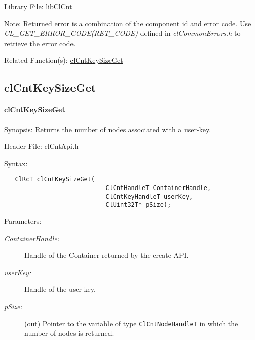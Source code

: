 \begin{Desc}
\item[Library File:]lib\-Cl\-Cnt\end{Desc}
\begin{Desc}
\item[Note:]Returned error is a combination of the component id and error code. Use \textit{CL\_\-GET\_\-ERROR\_\-CODE(RET\_\-CODE)} defined in \textit{clCommonErrors.h} to retrieve the error code.\end{Desc}
\begin{Desc}
\item[Related Function(s):]\hyperlink{pagecnt119}{cl\-Cnt\-Key\-Size\-Get} \end{Desc}


\newpage
\subsection{clCntKeySizeGet}
\hypertarget{pagecnt119}{}\paragraph{cl\-Cnt\-Key\-Size\-Get}\label{pagecnt119}
\begin{Desc}
\item[Synopsis:]Returns the number of nodes associated with a user-key.\end{Desc}
\begin{Desc}
\item[Header File:]clCntApi.h\end{Desc}
\begin{Desc}
\item[Syntax:]

\footnotesize\begin{verbatim}   ClRcT clCntKeySizeGet(
                  			ClCntHandleT ContainerHandle,
                  			ClCntKeyHandleT userKey,
                  			ClUint32T* pSize);
\end{verbatim}
\normalsize
\end{Desc}
\begin{Desc}
\item[Parameters:]
\begin{description}
\item[{\em Container\-Handle:}]Handle of the Container returned by the create API. 
\item[{\em user\-Key:}]Handle of the user-key. 
\item[{\em p\-Size:}](out) Pointer to the variable of type {\tt{ClCntNodeHandleT}} in which the number of nodes is returned.
\end{description}
\end{Desc}
